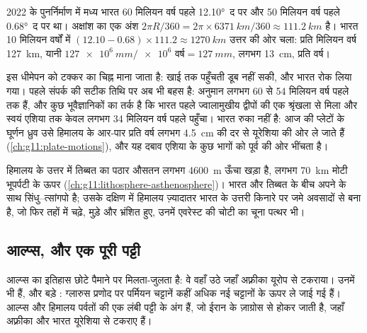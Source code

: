 \begin{example}[भारत की चाल]\label{ex:g12:mountain-building:india}
2022 के पुनर्निर्माण में मध्य भारत 60 मिलियन
वर्ष पहले \ang{12.10}~द पर और 50 मिलियन वर्ष पहले \ang{0.68}~द पर था। अक्षांश का एक अंश
$2\pi R/360 = 2\pi \times \qty{6371}{km}/360 \approx \qty{111.2}{km}$ है। भारत
10 मिलियन वर्षों में $(12.10 - 0.68) \times 111.2 \approx \qty{1270}{km}$ उत्तर की ओर चला:
प्रति मिलियन वर्ष \qty{127}{km}, यानी $\qty{127e6}{mm} /
\num{e6}\text{ वर्ष} = \qty{127}{mm}$, लगभग \qty{13}{cm}, प्रति वर्ष।
\end{example}

इस धीमेपन को टक्कर का चिह्न माना जाता है: खाई तक पहुँचती
 डूब नहीं सकी, और भारत रोक लिया गया। पहले संपर्क की सटीक तिथि पर अब भी बहस है: अनुमान
लगभग 60 से 54 मिलियन वर्ष पहले तक हैं, और कुछ भूवैज्ञानिकों का तर्क है कि
भारत पहले ज्वालामुखीय द्वीपों की एक श्रृंखला से मिला और स्वयं एशिया तक केवल
लगभग 34 मिलियन वर्ष पहले पहुँचा। भारत रुका नहीं है: आज की प्लेटों के घूर्णन ध्रुव
उसे हिमालय के आर-पार प्रति वर्ष लगभग \qty{4.5}{cm} की दर से यूरेशिया की ओर ले जाते हैं
(\cref{ch:g11:plate-motions}), और यह दबाव एशिया के कुछ भागों को
पूर्व की ओर भींचता है।

हिमालय के उत्तर में तिब्बत का पठार औसतन लगभग \qty{4600}{m} ऊँचा खड़ा है,
लगभग \qty{70}{km} मोटी भूपर्पटी के ऊपर
(\cref{ch:g11:lithosphere-asthenosphere})। भारत और तिब्बत के बीच
अपने  के साथ सिंधु--त्सांगपो  है; उसके दक्षिण में हिमालय
ज़्यादातर भारत के उत्तरी किनारे पर जमे अवसादों से बना है, जो फिर तहों में चढ़े,
मुड़े और भ्रंशित हुए, उनमें एवरेस्ट की चोटी का चूना पत्थर भी।

\subsection{आल्प्स, और एक पूरी पट्टी}

आल्प्स का इतिहास छोटे पैमाने पर मिलता-जुलता है: वे वहाँ उठे जहाँ अफ़्रीका
यूरोप से टकराया। उनमें भी  हैं, और बड़े : ग्लारुस
प्रणोद पर पर्मियन चट्टानें कहीं अधिक नई चट्टानों के ऊपर ले जाई गई हैं।
आल्प्स और हिमालय पर्वतों की एक लंबी पट्टी के अंग हैं, जो ईरान के
ज़ाग्रोस से होकर जाती है, जहाँ अफ़्रीका और भारत यूरेशिया से टकराए हैं।

